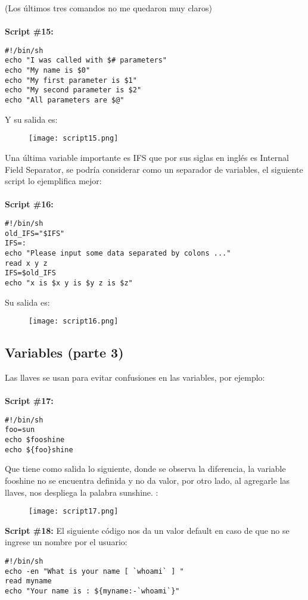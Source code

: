 \documentclass[a4paper]{article}
\begin{document}
(Los últimos tres comandos no me quedaron muy claros)\\
\\
\textbf{Script \#15:} 
\begin{verbatim}
#!/bin/sh
echo "I was called with $# parameters"
echo "My name is $0"
echo "My first parameter is $1"
echo "My second parameter is $2"
echo "All parameters are $@"
\end{verbatim}

Y su salida es:
 \begin{figure}[h!]
  \texttt{[image: script15.png]}
  \centering
  \label{fig:28}
\end{figure}

Una última variable importante es IFS que por sus siglas en inglés es Internal Field Separator, se podría considerar como un separador de variables, el siguiente script lo ejemplifica mejor:\\
\\
\textbf{Script \#16:}
\begin{verbatim}
#!/bin/sh
old_IFS="$IFS"
IFS=:
echo "Please input some data separated by colons ..."
read x y z
IFS=$old_IFS
echo "x is $x y is $y z is $z"
\end{verbatim}

Su salida es:
 \begin{figure}[h!]
  \texttt{[image: script16.png]}
  \centering
  \label{fig:29}
\end{figure}
\subsection{Variables (parte 3)}
Las llaves se usan para evitar confusiones en las variables, por ejemplo: \\
\\
\textbf{Script \#17:}
\begin{verbatim}
#!/bin/sh
foo=sun
echo $fooshine     
echo ${foo}shine   
\end{verbatim}

Que tiene como salida lo siguiente, donde se observa la diferencia, la variable fooshine no se encuentra definida y no da valor, por otro lado, al agregarle las llaves, nos despliega la palabra sunshine. :
 \begin{figure}[h!]
  \texttt{[image: script17.png]}
  \centering
  \label{fig:30}
\end{figure}

\textbf{Script \#18:} El siguiente código nos da un valor default en caso de que no se ingrese un nombre por el usuario: 
\begin{verbatim}
#!/bin/sh
echo -en "What is your name [ `whoami` ] "
read myname
echo "Your name is : ${myname:-`whoami`}"
\end{verbatim}
\end{document}
